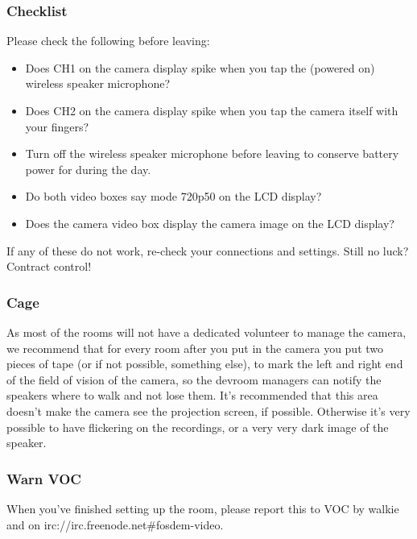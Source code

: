 \documentclass{article}
\begin{document}
\subsubsection{Checklist}
Please check the following before leaving:
\begin{itemize}
  \item Does CH1 on the camera display spike when you tap the (powered on) wireless speaker microphone?
  \item Does CH2 on the camera display spike when you tap the camera itself with your fingers?
  \item Turn off the wireless speaker microphone before leaving to conserve battery power for during the day.
  \item Do both video boxes say mode 720p50 on the LCD display?
  \item Does the camera video box display the camera image on the LCD display?
\end{itemize}

If any of these do not work, re-check your connections and settings. Still no luck? Contract control!

\subsubsection{Cage}

As most of the rooms will not have a dedicated volunteer to manage the camera, we recommend that for every room after you put in the camera you put two pieces of tape (or if not possible, something else), to mark the left and right end of the field of vision of the camera, so the devroom managers can notify the speakers where to walk and not lose them. It's recommended that this area doesn't make the camera see the projection screen, if possible. Otherwise it's very possible to have flickering on the recordings, or a very very dark image of the speaker.

\subsubsection{Warn VOC}
When you've finished setting up the room, please report this to VOC by walkie and on irc://irc.freenode.net\#fosdem-video.
\end{document}
